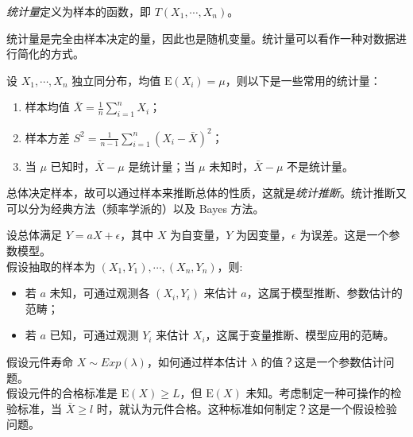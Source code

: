 \documentclass[../main.tex]{subfiles}
\begin{document}
\begin{definition*}\label{def:6.0.1}
    \emph{统计量}定义为样本的函数，即 $T(X_1,\cdots,X_n)$。
\end{definition*}

统计量是完全由样本决定的量，因此也是随机变量。统计量可以看作一种对数据进行简化的方式。

\begin{example*}
    设 $X_1,\cdots,X_n$ 独立同分布，均值 $\mathrm E(X_i)=\mu$，则以下是一些常用的统计量：
    \begin{enumerate}
        \item 样本均值 $\bar X=\frac1n\sum_{i=1}^nX_i$；
        \item 样本方差 $S^2=\frac1{n-1}\sum_{i=1}^n(X_i-\bar X)^2$；
        \item 当 $\mu$ 已知时，$\bar X-\mu$ 是统计量；当 $\mu$ 未知时，$\bar X-\mu$ 不是统计量。
    \end{enumerate}
\end{example*}

总体决定样本，故可以通过样本来推断总体的性质，这就是\emph{统计推断}。统计推断又可以分为经典方法（频率学派的）以及 Bayes 方法。

\begin{example*}
    设总体满足 $Y=aX+\epsilon$，其中 $X$ 为自变量，$Y$ 为因变量，$\epsilon$ 为误差。这是一个参数模型。\\
    假设抽取的样本为 $(X_1,Y_1),\cdots,(X_n,Y_n)$，则:
    \begin{itemize}
        \item 若 $a$ 未知，可通过观测各 $(X_i,Y_i)$ 来估计 $a$，这属于模型推断、参数估计的范畴；
        \item 若 $a$ 已知，可通过观测 $Y_i$ 来估计 $X_i$，这属于变量推断、模型应用的范畴。
    \end{itemize}
\end{example*}

\begin{example*}
    假设元件寿命 $X\sim Exp(\lambda)$，如何通过样本估计 $\lambda$ 的值？这是一个参数估计问题。\\
    假设元件的合格标准是 $\mathrm E(X)\geq L$，但 $\mathrm E(X)$ 未知。考虑制定一种可操作的检验标准，当 $\bar X\geq l$ 时，就认为元件合格。这种标准如何制定？这是一个假设检验问题。
\end{example*}
\end{document}
